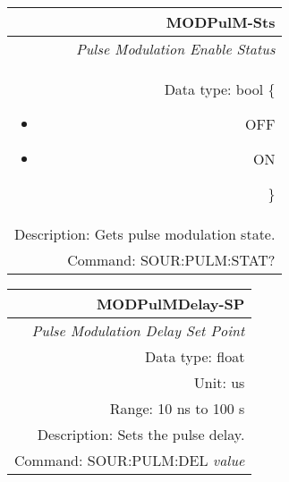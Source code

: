 \documentclass[openany]{article}
\begin{document}
		\begin{tabular}{N}
			\hline
			\bfseries MODPulM-Sts \\ \hline
			\emph{Pulse Modulation Enable Status} \\
			Data type: bool \{\begin{itemize}[noitemsep]
				\small
				\item[] OFF
				\item[] ON
			\end{itemize}\} \\
			Description: Gets pulse modulation state. \\
			Command: SOUR:PULM:STAT? \\
			
		\end{tabular}
%
		\begin{tabular}{N}
			\hline
			\bfseries MODPulMDelay-SP \\ \hline
			\emph{Pulse Modulation Delay Set Point} \\
			Data type: float \\
			Unit: us \\ 
			Range: 10 ns to 100 s \\
			Description: Sets the pulse delay. \\
			Command: SOUR:PULM:DEL \emph{value} \\
			
		\end{tabular}
\end{document}
